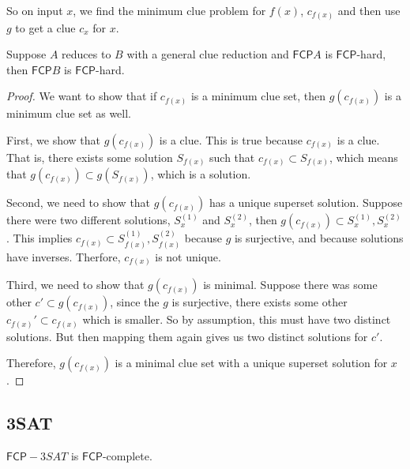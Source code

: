 \documentclass[runningheads,a4paper]{llncs}
\begin{document}
So on input $x$, we find the minimum clue problem for $f(x)$, $c_{f(x)}$ and then use $g$ to get a clue $c_x$ for $x$.  

\begin{theorem}
Suppose $A$ reduces to $B$ with a general clue reduction and $\mathsf{FCP} A$ is $\mathsf{FCP}$-hard, then $\mathsf{FCP} B$ is $\mathsf{FCP}$-hard. 
\end{theorem}

\begin{proof}
We want to show that if $c_{f(x)}$ is a minimum clue set, then $g(c_{f(x)})$ is a minimum clue set as well.

First, we show that $g(c_{f(x)})$ is a clue. This is true because $c_{f(x)}$ is a clue. That is, there exists some solution $S_{f(x)}$ such that $c_{f(x)} \subset S_{f(x)}$, which means that $g(c_{f(x)}) \subset g(S_{f(x)})$, which is a solution.

Second, we need to show that $g(c_{f(x)})$ has a unique superset solution. Suppose there were two different solutions, $S_x^{(1)}$ and $S_{x}^{(2)}$, then $g(c_{f(x)}) \subset S_x^{(1)}, S_x^{(2)}$. This implies $c_{f(x)} \subset S_{f(x)}^{(1)}, S_{f(x)}^{(2)}$ because $g$ is surjective, and because solutions have inverses. Therfore, $c_{f(x)}$ is not unique.

Third, we need to show that $g(c_{f(x)})$ is minimal. Suppose there was some other $c' \subset g(c_{f(x)})$, since the $g$ is surjective, there exists some other $c_{f(x)}' \subset c_{f(x)}$ which is smaller. So by assumption, this must have two distinct solutions. But then mapping them again gives us two distinct solutions for $c'$. 

Therefore, $g(c_{f(x)})$ is a minimal clue set with a unique superset solution for $x$.
\end{proof}

\subsection{3SAT}

\begin{theorem}
$\mathsf{FCP}-3SAT$ is $\mathsf{FCP}$-complete. 
\end{theorem} 
\end{document}
